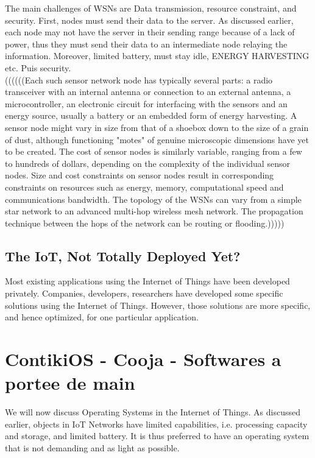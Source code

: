 The main challenges of WSNs are Data transmission, resource constraint, and security. First, nodes must send their data to the server. As discussed earlier, each node may not have the server in their sending range because of a lack of power, thus they must send their data to an intermediate node relaying the information. Moreover, limited battery, must stay idle, ENERGY HARVESTING etc. Puis security.\\

((((((Each such sensor network node has typically several parts: a radio transceiver with an internal antenna or connection to an external antenna, a microcontroller, an electronic circuit for interfacing with the sensors and an energy source, usually a battery or an embedded form of energy harvesting. A sensor node might vary in size from that of a shoebox down to the size of a grain of dust, although functioning "motes" of genuine microscopic dimensions have yet to be created. The cost of sensor nodes is similarly variable, ranging from a few to hundreds of dollars, depending on the complexity of the individual sensor nodes. Size and cost constraints on sensor nodes result in corresponding constraints on resources such as energy, memory, computational speed and communications bandwidth. The topology of the WSNs can vary from a simple star network to an advanced multi-hop wireless mesh network. The propagation technique between the hops of the network can be routing or flooding.)))))\\

\section{The IoT, Not Totally Deployed Yet?}

Most existing applications using the Internet of Things have been developed privately. Companies, developers, researchers have developed some specific solutions using the Internet of Things. However, those solutions are more specific, and hence optimized, for one particular application.\\


\chapter{ContikiOS - Cooja - Softwares a portee de main}

We will now discuss Operating Systems in the Internet of Things. As discussed earlier, objects in IoT Networks have limited capabilities, i.e. processing capacity and storage, and limited battery. It is thus preferred to have an operating system that is not demanding and as light as possible. \\

